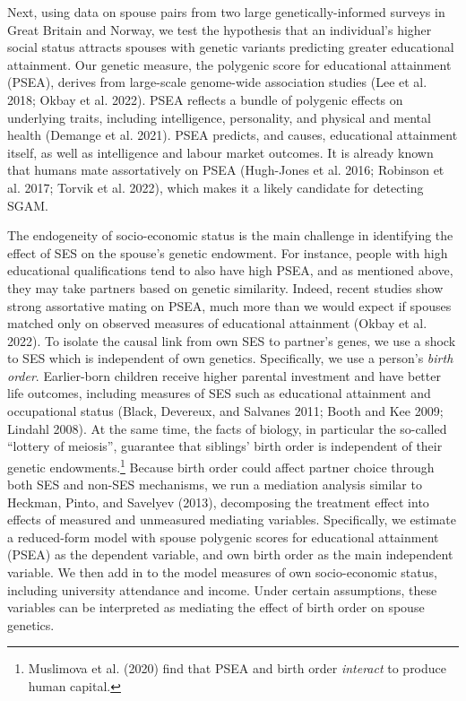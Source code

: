 \documentclass[
  12pt,
]{article}
\theoremstyle{definition}
\theoremstyle{definition}
\theoremstyle{definition}
\theoremstyle{definition}
\theoremstyle{remark}
\begin{document}
Next, using data on spouse pairs from two large genetically-informed surveys in
Great Britain and Norway, we test the hypothesis that an individual's higher
social status attracts spouses with genetic variants predicting greater educational
attainment. Our genetic measure, the polygenic score for educational attainment
(PSEA), derives from large-scale genome-wide association studies (Lee et al. 2018; Okbay et al. 2022). PSEA reflects a bundle of polygenic effects on underlying
traits, including intelligence, personality, and physical and mental health
(Demange et al. 2021). PSEA predicts, and causes, educational attainment
itself, as well as intelligence and labour market outcomes. It is already known
that humans mate assortatively on PSEA (Hugh-Jones et al. 2016; Robinson et al. 2017; Torvik et al. 2022), which makes it a likely candidate
for detecting SGAM.

The endogeneity of socio-economic status is the main challenge in identifying
the effect of SES on the spouse's genetic endowment. For instance, people with
high educational qualifications tend to also have high PSEA, and as mentioned
above, they may take partners based on genetic similarity. Indeed, recent
studies show strong assortative mating on PSEA, much more than we would expect
if spouses matched only on observed measures of educational attainment
(Okbay et al. 2022). To isolate the causal link from own SES to partner's
genes, we use a shock to SES which is independent of own genetics. Specifically,
we use a person's \emph{birth order}. Earlier-born children receive higher parental
investment and have better life outcomes, including measures of SES such as
educational attainment and occupational status (Black, Devereux, and Salvanes 2011; Booth and Kee 2009; Lindahl 2008). At the same time, the facts of biology, in
particular the so-called ``lottery of meiosis'', guarantee that siblings' birth
order is independent of their genetic endowments.\footnote{Muslimova et al. (2020) find that PSEA and birth order
  \emph{interact} to produce human capital.} Because birth order
could affect partner choice through both SES and non-SES mechanisms, we run a
mediation analysis similar to Heckman, Pinto, and Savelyev (2013), decomposing the treatment
effect into effects of measured and unmeasured mediating variables. Specifically,
we estimate a reduced-form model with spouse polygenic scores for educational
attainment (PSEA) as the dependent variable, and own birth order as the main
independent variable. We then add in to the model measures of own socio-economic
status, including university attendance and income. Under certain assumptions,
these variables can be interpreted as mediating the effect of birth order on
spouse genetics.
\end{document}
